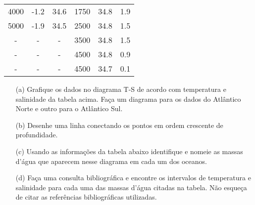 \documentclass[a4paper,10pt]{article}
\begin{document}
\begin{center}
\begin{tabular}{|c|c|c|c|c|c|}
    4000    & -1.2           & 34.6               & 1750 & 34.8           &  1.9           \\     
    5000    & -1.9           & 34.5               & 2500 & 34.8           &  1.5           \\    
    -       & -              & -                  & 3500 & 34.8           &  1.5           \\  
    -       & -              & -                  & 4500 & 34.8           &  0.9           \\ 
    -       & -              & -                  & 4500 & 34.7           &  0.1           \\
    \hline
  \end{tabular}
\end{center}

\begin{itemize}
  \item[(a)] Grafique os dados no diagrama T-S de acordo com temperatura e salinidade da tabela acima. Faça um diagrama para os dados do Atlântico Norte e outro para o Atlântico Sul.
  \item[(b)] Desenhe uma linha conectando os pontos em ordem crescente de profundidade.
  \item[(c)] Usando as informações da tabela abaixo identifique e nomeie as  massas d'água que aparecem nesse diagrama em cada um dos oceanos.
  \item[(d)] Faça uma consulta bibliográfica e encontre os intervalos de temperatura e salinidade para cada uma das massas d'água citadas na tabela. Não esqueça de citar as referências bibliográficas utilizadas. 
  \end{itemize}
\end{document}
